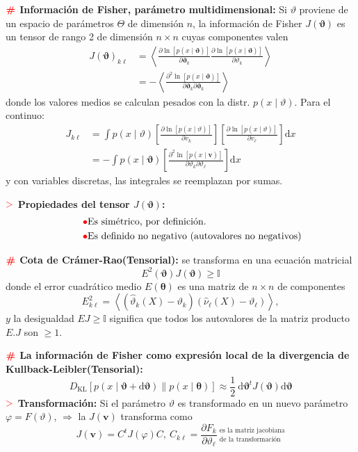 \documentclass[%
 reprint,
 amsmath,amssymb,
 aps,
]{revtex4-1}
\begin{document}
\textbf{$\color{red}{\textbf{\#}}$ Información de Fisher, parámetro multidimensional:}
Si $\vartheta$ proviene de un espacio de parámetros $\Theta$ de dimensión $n$, la información de
Fisher $J(\boldsymbol{\vartheta})$ es un tensor de rango 2 de dimensión $n \times n$ cuyas componentes valen
$$
\begin{aligned}
J(\boldsymbol{\vartheta})_{k \ell} &=\left\langle\frac{\partial \ln [p(x \mid \boldsymbol{\vartheta})]}{\partial \boldsymbol{\vartheta}_{k}} \frac{\partial \ln [p(x \mid \boldsymbol{\vartheta})]}{\partial \vartheta_{k}}\right\rangle \\
&=-\left\langle\frac{\partial^{2} \ln [p(x \mid \boldsymbol{\vartheta})]}{\partial \boldsymbol{\vartheta}_{k} \partial \boldsymbol{\vartheta}_{k}}\right\rangle
\end{aligned}
$$
donde los valores medios se calculan pesados con la distr. $p(x \mid \vartheta)$. Para el continuo:
$$
\begin{aligned}
J_{k \ell} &=\int p(x \mid \vartheta)\left[\frac{\partial \ln [p(x \mid \vartheta)]}{\partial v_{k}}\right]\left[\frac{\partial \ln [p(x \mid \vartheta)]}{\partial v_{\ell}}\right] \mathrm{d} x \\
&=-\int p(x \mid \boldsymbol{\vartheta})\left[\frac{\partial^{2} \ln [p(x \mid \boldsymbol{v})]}{\partial \vartheta_{k} \partial \vartheta_{\ell}}\right] \mathrm{d} x
\end{aligned}
$$
y con variables discretas, las integrales se reemplazan por sumas. 

\textbf{$\textcolor{red}{\mathbf{>}}$ Propiedades del tensor $J(\mathbf{\vartheta})$:}
$$
\begin{aligned}  
   &\qquad\ {\color{red}{\bullet}} \text{Es simétrico, por definición.} \\
   &\qquad\ {\color{red}{\bullet}} \text{Es definido no negativo (autovalores no negativos)}
\end{aligned}
$$

\textbf{$\color{red}{\textbf{\#}}$ Cota de Crámer-Rao(Tensorial):} 
se transforma en una ecuación matricial
$$
E^{2}(\boldsymbol{\vartheta}) J(\boldsymbol{\vartheta}) \geq \mathbb{I}
$$
donde el error cuadrático medio $E(\boldsymbol{\theta})$ es una matriz de $n \times n$ de componentes
$$
E_{k \ell}^{2}=\left\langle 
\left(
  \hat{\vartheta}_{k}(X)-\vartheta_{k}
  \right)
\left(
  \hat{\nu}_{\ell}(X)-\vartheta_{\ell}
  \right)
  \right\rangle,
$$
$y$ la desigualdad $E J \geq \mathbb{I}$ significa que todos los autovalores de la matriz producto $E . J$ son $\geq 1$.

\textbf{$\color{red}{\textbf{\#}}$ La información de Fisher como expresión local de la divergencia de Kullback-Leibler(Tensorial):}
$$
D_{\mathrm{KL}}[p(x \mid \boldsymbol{\vartheta}+\mathrm{d} \boldsymbol{\vartheta}) \| p(x \mid \boldsymbol{\theta})] \approx \frac{1}{2} \mathrm{~d} \boldsymbol{\vartheta}^{t} J(\boldsymbol{\vartheta}) \mathrm{d} \boldsymbol{\vartheta}
$$
\textbf{$\textcolor{red}{\mathbf{>}}$ Transformación:} 
Si el parámetro $\vartheta$ es transformado en un nuevo parámetro $\varphi=F(\vartheta)$, $\Rightarrow$ la $J(\boldsymbol{v})$ transforma como
$$
J(\boldsymbol{v})=C^{t} J(\varphi) C
, \
C_{k \ell}=\frac{\partial F_{k}}{\partial \vartheta_{\ell}} \
^\text{es la matriz jacobiana}
_\text{de la transformación}
$$
\end{document}
